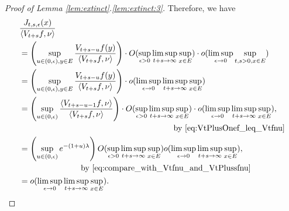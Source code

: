 \documentclass[12pt,a4paper]{amsart}
\numberwithin{equation}{section}
\theoremstyle{plain}
\theoremstyle{definition}
\begin{document}
\begin{proof}[Proof of Lemma \ref{lem:extinct}.\eqref{lem:extinct:3}]
Therefore, we have
\begin{align}
&\frac{J_{t,s,\epsilon}(x)}{\left \langle V_{t+s}f,\nu\right\rangle}
  \\ & =\left(\sup_{u\in (0,\epsilon), y \in E}\frac{V_{t+s-u}f(y)}{\left\langle V_{t+s}f,\nu \right\rangle}\right)\cdot O(\sup_{\epsilon>0}\limsup_{t+s\to \infty} \sup_{x\in E})\cdot o(\limsup_{\epsilon \to 0}\sup_{t,s>0,x\in E})
  \\ & = \left(\sup_{u\in (0,\epsilon), y \in E}\frac{V_{t+s-u}f(y)}{\left\langle V_{t+s}f,\nu \right\rangle}\right)\cdot o(\limsup_{\epsilon \to 0}\limsup_{t+s\to \infty}\sup_{x\in E})
  \\ & \begin{multlined} = \left(\sup_{u\in (0,\epsilon)}\frac{\left\langle V_{t+s - u - 1} f, \nu \right\rangle}{\left\langle V_{t+s}f,\nu \right\rangle} \right) \cdot O(\sup_{\epsilon >  0}\limsup_{t+s \to \infty}\sup_{x\in E}) \cdot o(\limsup_{\epsilon \to 0}\limsup_{t+s\to \infty}\sup_{x\in E}),
\\\quad\text{by~\eqref{eq:VtPlusOnef_leq_Vtfnu}} \end{multlined}
  \\ & \begin{multlined}
= \left(\sup_{u\in (0,\epsilon)}e^{-(1+u) \lambda} \right) O(\sup_{\epsilon > 0} \limsup_{t+s\to \infty}\sup_{x\in E}) o(\limsup_{\epsilon \to 0}\limsup_{t+s\to \infty}\sup_{x\in E}),
\\ \quad\text{by~\eqref{eq:compare_with_Vtfnu_and_VtPlussfnu}}
\end{multlined}
\\ & = o(\limsup_{\epsilon \to 0}\limsup_{t+s\to \infty}\sup_{x\in E}). \label{eq:8}
\end{align}


\end{proof}
\end{document}
